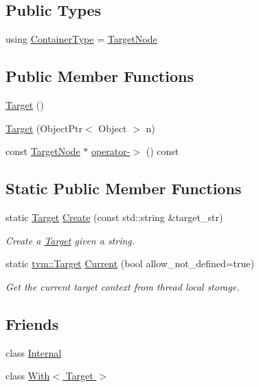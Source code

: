 \subsection*{Public Types}
\begin{DoxyCompactItemize}
\item 
using \hyperlink{classtvm_1_1Target_aeb3fa7acc93ba5f47ea49d30d14fbf65}{Container\+Type} = \hyperlink{classtvm_1_1TargetNode}{Target\+Node}
\end{DoxyCompactItemize}
\subsection*{Public Member Functions}
\begin{DoxyCompactItemize}
\item 
\hyperlink{classtvm_1_1Target_a38e57f96a834847f3c1d3e989c28bde0}{Target} ()
\item 
\hyperlink{classtvm_1_1Target_a37092add55b8d783bd4384eae6e37c42}{Target} (Object\+Ptr$<$ Object $>$ n)
\item 
const \hyperlink{classtvm_1_1TargetNode}{Target\+Node} $\ast$ \hyperlink{classtvm_1_1Target_a610d7c40d9652d795f9de161ca42ffb6}{operator-\/$>$} () const 
\end{DoxyCompactItemize}
\subsection*{Static Public Member Functions}
\begin{DoxyCompactItemize}
\item 
static \hyperlink{classtvm_1_1Target}{Target} \hyperlink{classtvm_1_1Target_a3c78117b29f64fe1c5c60473a9d4daae}{Create} (const std\+::string \&target\+\_\+str)
\begin{DoxyCompactList}\small\item\em Create a \hyperlink{classtvm_1_1Target}{Target} given a string. \end{DoxyCompactList}\item 
static \hyperlink{classtvm_1_1Target}{tvm\+::\+Target} \hyperlink{classtvm_1_1Target_abed5e5cfb5d36e70ea5eaadef9fb63b2}{Current} (bool allow\+\_\+not\+\_\+defined=true)
\begin{DoxyCompactList}\small\item\em Get the current target context from thread local storage. \end{DoxyCompactList}\end{DoxyCompactItemize}
\subsection*{Friends}
\begin{DoxyCompactItemize}
\item 
class \hyperlink{classtvm_1_1Target_a8bde6eb35df6b3a9f53810e0bc79fdfd}{Internal}
\item 
class \hyperlink{classtvm_1_1Target_aba1b161cfd80c2ac8c5ecf65a27e7c56}{With$<$ Target $>$}
\end{DoxyCompactItemize}


